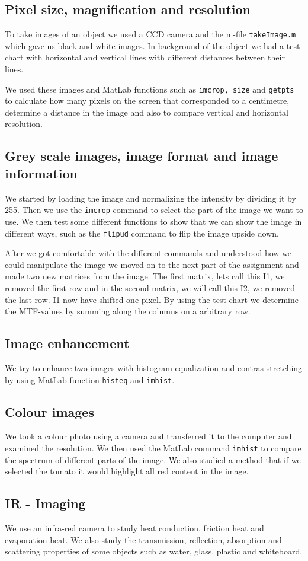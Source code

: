 \subsection{Pixel size, magnification and resolution}
To take images of an object we used a CCD camera and the m-file \texttt{takeImage.m} which gave us black and white images. In background of the object we had a test chart with horizontal and vertical lines with different distances between their lines. 

We used these images and MatLab functions such as \texttt{imcrop, size} and \texttt{getpts} to calculate how many pixels on the screen that corresponded to a centimetre, determine a distance in the image and also to compare vertical and horizontal resolution. 

\subsection{Grey scale images, image format and image information}
We started by loading the image and normalizing the intensity by dividing it by 255. Then we use the \texttt{imcrop} command to select the part of the image we want to use. We then test some different functions to show that we can show the image in different ways, such as the \texttt{flipud} command to flip the image upside down. 

After we got comfortable with the different commands and understood how we could manipulate the image we moved on to the next part of the assignment and made two new matrices from the image. The first matrix, lets call this I1, we removed the first row and in the second matrix, we will call this I2, we removed the last row. I1 now have shifted one pixel.
By using the test chart we determine the MTF-values by summing along the columns on a arbitrary row.

\subsection{Image enhancement}
We try to enhance two images with histogram equalization and contras stretching by using MatLab function \texttt{histeq} and \texttt{imhist}. 

\subsection{Colour images}
We took a colour photo using a camera and transferred it to the computer and examined the resolution. We then used the MatLab command \texttt{imhist} to compare the spectrum of different parts of the image. %
We also studied a method that if we selected the tomato it would highlight all red content in the image.

\subsection{IR - Imaging}
We use an infra-red camera to study heat conduction, friction heat and evaporation heat. We also study the transmission, reflection, absorption and scattering properties of some objects such as water, glass, plastic and whiteboard.